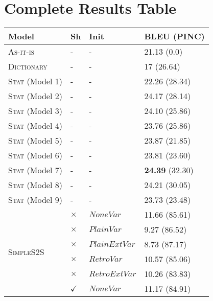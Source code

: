 \documentclass[11pt,letterpaper]{article}
\begin{document}
\section{Complete Results Table}
\begin{table}
\centering
\scriptsize
\addtolength{\tabcolsep}{-2pt}
\begin{tabular}{|l|l|l|l| }
\hline 
Model & Sh  & Init  & BLEU (PINC) \\ \hline \hline
\textsc{As-it-is}  & {-} & {-}  &  {21.13} (0.0)  \\ \hline
\textsc{Dictionary}  & {-} & {-}  &  {17} (26.64)  \\ \hline
\textsc{Stat} (Model 1)  & {-} & {-}  &  {22.26} (28.34)  \\ \hline
\textsc{Stat} (Model 2)  & {-} & {-}  &  {24.17} (28.14)   \\ \hline
\textsc{Stat} (Model 3)  & {-} & {-}  &  {24.10} (25.86)   \\ \hline
\textsc{Stat} (Model 4)  & {-} & {-}  &  {23.76} (25.86)   \\ \hline
\textsc{Stat} (Model 5)  & {-} & {-}  &  {23.87} (21.85)   \\ \hline
\textsc{Stat} (Model 6)  & {-} & {-}  &  {23.81} (23.60)    \\ \hline
\textsc{Stat} (Model 7)   & {-} & {-}  &  \textbf{24.39} (32.30)    \\ \hline
\textsc{Stat} (Model 8)  & {-} & {-}  &  {24.21} (30.05)    \\ \hline
\textsc{Stat} (Model 9)  & {-} & {-}  &  {23.73} (23.48)   \\ \hline
\multirow{10}{*}{\textsc{SimpleS2S}} &  $\times$ & $NoneVar$ & 11.66 (85.61) \\
&  $\times$ & $PlainVar$ & 9.27 (86.52) \\
 & $\times$ & $PlainExtVar$  & 8.73 (87.17) \\ 
 & $\times$ & $RetroVar$ &  10.57 (85.06) \\ 
& $\times$ & $RetroExtVar$  & 10.26 (83.83) \\ 
& $\checkmark$ & $NoneVar$ &  11.17 (84.91) \\

\end{tabular}
\end{table}
\end{document}
